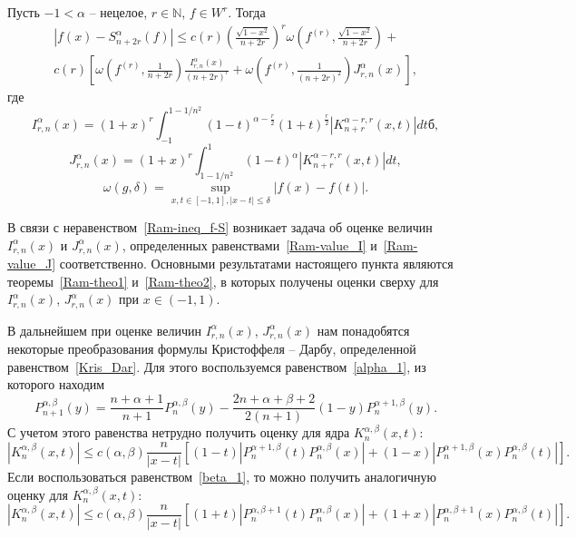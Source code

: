 \begin{theoremA}\label{GRM-th-A}
Пусть $-1<\alpha$ -- нецелое, $r\in\mathbb{N}$, $f\in W^r$. Тогда
\begin{multline}\label{Ram-ineq_f-S}
|f(x)-S^\alpha_{n+2r}(f)|\le c(r)\left(\frac{\sqrt{1-x^2}}{n+2r}\right)^r\omega\left(f^{(r)},\frac{\sqrt{1-x^2}}{n+2r}\right)+ \\
c(r)\left[\omega\left(f^{(r)},\frac{1}{n+2r}\right)\frac{I_{r,n}^\alpha(x)}{(n+2r)^r}+\omega\left(f^{(r)},\frac{1}{(n+2r)^2}\right)J_{r,n}^\alpha(x)\right],
\end{multline}
где
\begin{equation}\label{Ram-value_I}
I_{r,n}^\alpha(x)=(1+x)^r\int_{-1}^{1-1/n^2}(1-t)^{\alpha-\frac{r}{2}}(1+t)^{\frac{r}{2}}|K_{n+r}^{\alpha-r,r}(x,t)|dtб,
\end{equation}
\begin{equation}\label{Ram-value_J}
J_{r,n}^\alpha(x)=(1+x)^r\int_{1-1/n^2}^{1}(1-t)^{\alpha}|K_{n+r}^{\alpha-r,r}(x,t)|dt,
\end{equation}
$$
\omega(g,\delta)=\sup_{x,t\in[-1,1], |x-t|\le\delta}|f(x)-f(t)|.
$$
\end{theoremA}


В связи с неравенством~\eqref{Ram-ineq_f-S} возникает задача об оценке величин $I_{r,n}^\alpha(x)$ и $J_{r,n}^\alpha(x)$, определенных равенствами~\eqref{Ram-value_I} и~\eqref{Ram-value_J} соответственно. Основными результатами настоящего пункта являются теоремы~\ref{Ram-theo1} и~\ref{Ram-theo2}, в которых получены оценки сверху для $I_{r,n}^\alpha(x)$, $J_{r,n}^\alpha(x)$ при $x\in(-1,1)$.

В дальнейшем при оценке величин $I_{r,n}^\alpha(x)$, $J_{r,n}^\alpha(x)$ нам понадобятся некоторые преобразования формулы Кристоффеля -- Дарбу, определенной равенством~\eqref{Kris_Dar}. Для этого воспользуемся равенством~\eqref{alpha_1}, из которого находим
$$
P_{n+1}^{\alpha,\beta}(y)=\frac{n+\alpha+1}{n+1}P_{n}^{\alpha,\beta}(y)-\frac{2n+\alpha+\beta+2}{2(n+1)}(1-y)P_{n}^{\alpha+1,\beta}(y).
$$
С учетом этого равенства нетрудно получить оценку для ядра $K_n^{\alpha,\beta}(x,t)$:
$$
|K_n^{\alpha,\beta}(x,t)|\le
c(\alpha,\beta)\frac{n}{|x-t|}\left[(1-t)|P_{n}^{\alpha+1,\beta}(t)P_{n}^{\alpha,\beta}(x)|+
(1-x)|P_{n}^{\alpha+1,\beta}(x)P_{n}^{\alpha,\beta}(t)|\right].
$$
Если воспользоваться равенством~\eqref{beta_1}, то можно получить аналогичную оценку для \linebreak$K_n^{\alpha,\beta}(x,t)$:
$$
|K_n^{\alpha,\beta}(x,t)|\le
c(\alpha,\beta)\frac{n}{|x-t|}\left[(1+t)|P_{n}^{\alpha,\beta+1}(t)P_{n}^{\alpha,\beta}(x)|+
(1+x)|P_{n}^{\alpha,\beta+1}(x)P_{n}^{\alpha,\beta}(t)|\right].
$$

